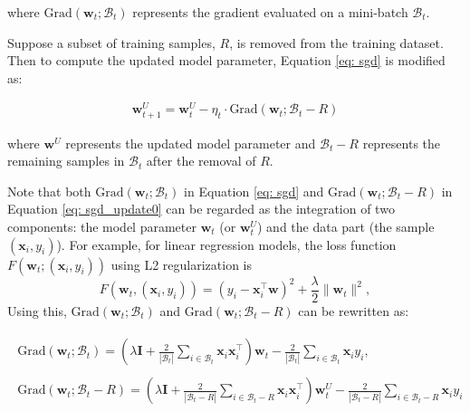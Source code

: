\documentclass[11pt]{article}
\newcommand{\uw}{\textbf{w}^{U}}
\newcommand{\w}{\textbf{w}}
\newcommand{\x}{\textbf{x}}
\newcommand{\y}{y}
\newcommand{\miniB}{\mathscr{B}}
\begin{document}
\noindent
where $\text{Grad}(\w_t; \miniB_t)$ represents the gradient evaluated on a mini-batch $\miniB_t$. 

Suppose a subset of training samples, $R$, is removed from the training dataset.  Then to compute the updated model parameter, Equation \eqref{eq: sgd} is modified as:
\begin{small}
\begin{align}\label{eq: sgd_update0}
    \uw_{t+1} = \uw_{t} - \eta_t\cdot \text{Grad}(\w_t; \miniB_t - R)
\end{align}
\end{small}
\noindent
where $\uw$ represents the updated model parameter and $\miniB_{t} - R$ represents the remaining samples in $\miniB_t$ after the removal of $R$.

Note that both $\text{Grad}(\w_t; \miniB_t)$ in Equation \eqref{eq: sgd} and $\text{Grad}(\w_t; \miniB_t - R)$ in Equation \eqref{eq: sgd_update0} can be regarded as the integration of two components: the model parameter $\w_t$ (or $\uw_t$) and the data part (the sample $(\x_i, \y_i)$). For example, for linear regression models, the loss function $F\left(\w_t; (\x_i, \y_i)\right)$ using L2 regularization is $$F\left(\w_{t}, (\x_i,\y_i)\right) = (y_i - \x_i^\top\w)^2 + \frac{\lambda}{2}\|\w_t\|^2,$$
Using this, $\text{Grad}(\w_t; \miniB_t)$ and $\text{Grad}(\w_t; \miniB_t - R)$ can be rewritten as:
\begin{small}
\begin{align}\label{eq: linear_regression_sgd}
    \begin{split}
        \text{Grad}(\w_t; \miniB_t) = (\lambda\textbf{I} + \frac{2}{|\miniB_t|}\sum\nolimits_{i \in \miniB_t} \x_i\x_i^\top)\w_t  - \frac{2}{|\miniB_t|}\sum\nolimits_{i \in \miniB_t}\x_i \y_i,
    \end{split}\\
    \begin{split}\label{eq: linear_regression_sgd_update0}
    \text{Grad}(\w_t; \miniB_t-R) = (\lambda\textbf{I} + \frac{2}{|\miniB_t - R|}\sum\nolimits_{i \in \miniB_t - R} \x_i\x_i^\top)\uw_t  - \frac{2}{|\miniB_t-R|}\sum\nolimits_{i \in \miniB_t-R}\x_i \y_i
\end{split}
\end{align}
\end{small}
\end{document}
